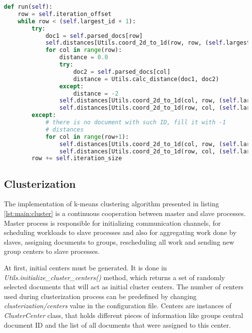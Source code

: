 \begin{lstlisting}[language=Python, caption={Distance.run() - Distance class process main method}, label={lst:distance:run}]
def run(self):
    row = self.iteration_offset
    while row < (self.largest_id + 1):
        try:
            doc1 = self.parsed_docs[row]
            self.distances[Utils.coord_2d_to_1d(row, row, (self.largest_id + 1))] = 1.0
            for col in range(row):
                distance = 0.0
                try:
                    doc2 = self.parsed_docs[col]
                    distance = Utils.calc_distance(doc1, doc2)
                except:
                    distance = -2
                self.distances[Utils.coord_2d_to_1d(col, row, (self.largest_id + 1))] = distance
                self.distances[Utils.coord_2d_to_1d(row, col, (self.largest_id + 1))] = distance
        except:
            # there is no document with such ID, fill it with -1
            # distances
            for col in range(row+1):
                self.distances[Utils.coord_2d_to_1d(col, row, (self.largest_id + 1))] = -1
                self.distances[Utils.coord_2d_to_1d(row, col, (self.largest_id + 1))] = -1
        row += self.iteration_size
\end{lstlisting}

\subsection{Clusterization} \label{impl:clusterization}

The implementation of k-means clustering algorithm presented in listing \ref{lst:main:cluster} is a continuous cooperation between master and slave processes. Master process is responsible for initializing communication channels, for scheduling workloads to slave processes and also for aggregating work done by slaves, assigning documents to groups, rescheduling all work and sending new group centers to slave processes.

At first, initial centers must be generated. It is done in \textit{Utils.initialize\_cluster\_centers()} method, which returns a set of randomly selected documents that will act as initial cluster centers. The number of centers used during clusterization process can be predefined by changing \textit{clusterization/centers} value in the configuration file. Centers are instances of \textit{ClusterCenter} class, that holds different pieces of information like groups central document ID and the list of all documents that were assigned to this center.

